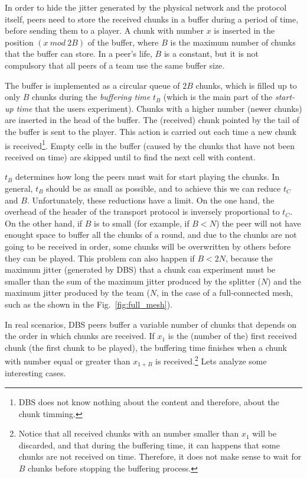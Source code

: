 
\label{sec:buffering_chunks}

In order to hide the jitter generated by the physical network and the
protocol itself, peers need to store the received chunks in a buffer
during a period of time, before sending them to a player. A chunk with
number $x$ is inserted in the position $(x~\mathit{mod}~2B)$ of the
buffer, where $B$ is the maximum number of chunks that the buffer can
store. In a peer's life, $B$ is a constant, but it is not compulsory
that all peers of a team use the same buffer size.

The buffer is implemented as a circular queue of $2B$ chunks, which is
filled up to only $B$ chunks during the \emph{buffering time} $t_B$
(which is the main part of the \emph{start-up time} that the users
experiment). Chunks with a higher number (newer chunks) are inserted
in the head of the buffer. The (received) chunk pointed by the tail of
the buffer is sent to the player. This action is carried out each time
a new chunk is received\footnote{DBS does not know nothing about the
  content and therefore, about the chunk timming.}. Empty cells in the
buffer (caused by the chunks that have not been received on time) are
skipped until to find the next cell with content.

$t_B$ determines how long the peers must wait for start playing the
chunks. In general, $t_B$ should be as small as possible, and to
achieve this we can reduce $t_C$ and $B$. Unfortunately, these
reductions have a limit. On the one hand, the overhead of the header
of the transport protocol is inversely proportional to $t_C$. On the
other hand, if $B$ is to small (for example, if $B<N$) the peer will
not have enought space to buffer all the chunks of a round, and due to
the chunks are not going to be received in order, some chunks will be
overwritten by others before they can be played. This problem can also
happen if $B<2N$, because the maximum jitter (generated by DBS) that a
chunk can experiment must be smaller than the sum of the maximum jitter
produced by the splitter ($N$) and the maximum jitter produced by the
team ($N$, in the case of a full-connected mesh, such as the shown in
the Fig.~\ref{fig:full_mesh}).

In real scenarios, DBS peers buffer a variable number of chunks that
depends on the order in which chunks are received. If $x_1$ is the
(number of the) first received chunk (the first chunk to be played),
the buffering time finishes when a chunk with number equal or greater
than $x_{1+B}$ is received.\footnote{Notice that all received chunks
  with an number smaller than $x_1$ will be discarded, and that during
  the buffering time, it can happens that some chunks are not received
  on time. Therefore, it does not make sense to wait for $B$ chunks
  before stopping the buffering process.} Lets analyze some
interesting cases.

